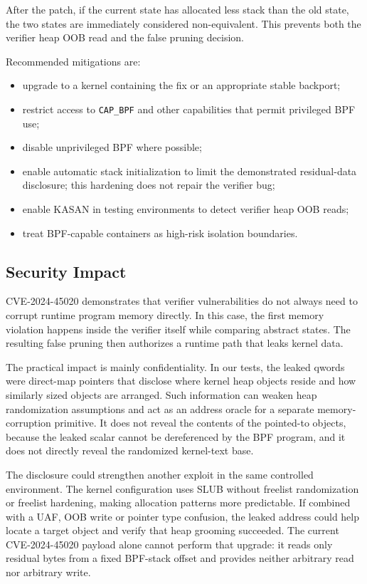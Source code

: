 \documentclass[../main.tex]{subfiles}
\begin{document}
After the patch, if the current state has allocated less stack than the old state, the two states are immediately considered non-equivalent. This prevents both the verifier heap OOB read and the false pruning decision.

Recommended mitigations are:

\begin{itemize}
    \item upgrade to a kernel containing the fix or an appropriate stable backport;
    \item restrict access to \texttt{CAP\_BPF} and other capabilities that permit privileged BPF use;
    \item disable unprivileged BPF where possible;
    \item enable automatic stack initialization to limit the demonstrated residual-data disclosure; this hardening does not repair the verifier bug;
    \item enable KASAN in testing environments to detect verifier heap OOB reads;
    \item treat BPF-capable containers as high-risk isolation boundaries.
\end{itemize}

\subsection{Security Impact}

CVE-2024-45020 demonstrates that verifier vulnerabilities do not always need to corrupt runtime program memory directly. In this case, the first memory violation happens inside the verifier itself while comparing abstract states. The resulting false pruning then authorizes a runtime path that leaks kernel data.

The practical impact is mainly confidentiality. In our tests, the leaked qwords were direct-map pointers that disclose where kernel heap objects reside and how similarly sized objects are arranged. Such information can weaken heap randomization assumptions and act as an address oracle for a separate memory-corruption primitive. It does not reveal the contents of the pointed-to objects, because the leaked scalar cannot be dereferenced by the BPF program, and it does not directly reveal the randomized kernel-text base.

The disclosure could strengthen another exploit in the same controlled environment. The kernel configuration uses SLUB without freelist randomization or freelist hardening, making allocation patterns more predictable. If combined with a UAF, OOB write or pointer type confusion, the leaked address could help locate a target object and verify that heap grooming succeeded. The current CVE-2024-45020 payload alone cannot perform that upgrade: it reads only residual bytes from a fixed BPF-stack offset and provides neither arbitrary read nor arbitrary write.
\end{document}
